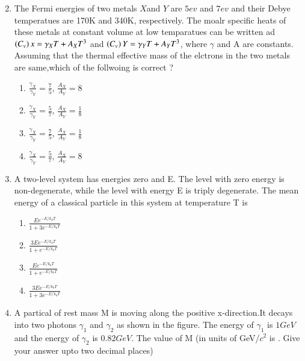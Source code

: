 \documentclass[journal]{IEEEtran}
\begin{document}
\begin{enumerate}
\begin{multicols}{2}
\end{multicols}
\vspace{0.5cm}
\item The Fermi energies of two metals $X$and $Y$ are $5ev$ and $7ev$ and their Debye temperatues are 170K and 340K, respectively. The moalr specific heats of these metals at constant volume at low temparatues can be written ad $\left(C_v\right)x=\gamma_X T+A_X T^3$ and $\left(C_v\right)Y=\gamma_Y T+A_Y T^3$, where $\gamma$ and A are constants. Assuming that the thermal effective mass of the elctrons in the two metals are same,which of the follwoing is correct ?
\begin{multicols}{2}
\begin{enumerate}
    \item $\frac{\gamma_X}{\gamma_Y}=\frac{7}{5}$, $\frac{A_X}{A_Y}=8$
    \item $\frac{\gamma_X}{\gamma_Y}=\frac{5}{7}$, $\frac{A_X}{A_Y}=\frac{1}{8}$
    \item $\frac{\gamma_X}{\gamma_Y}=\frac{7}{5}$, $\frac{A_X}{A_Y}=\frac{1}{8}$
    \item $\frac{\gamma_X}{\gamma_Y}=\frac{5}{7}$, $\frac{A_X}{A_Y}=8$
\end{enumerate}
\end{multicols}
\vspace{0.5cm}
\item A two-level system has energies zero and E. The level with zero energy is non-degenerate, while the level with energy E is triply degenerate. The mean energy of a classical particle in this system at temperature T is
\begin{multicols}{2}
    \begin{enumerate}
        \item $\frac{Ee^{-E/k_b T}}{1+3e^{-E/k_b T}}$
        \item $\frac{3Ee^{-E/k_b T}}{1+e^{-E/k_b T}}$
        \item $\frac{Ee^{-E/k_b T}}{1+e^{-E/k_b T}}$
        \item $\frac{3Ee^{-E/k_b T}}{1+3e^{-E/k_b T}}$
    \end{enumerate}
\end{multicols}

\vspace{0.5cm}
\item A partical of rest mass M is moving along the positive x-direction.It decays into two photons $\gamma_1$ and $\gamma_2$ as shown in the figure. The energy of $\gamma_1$ is $1GeV$ and the energy of $\gamma_2$ is $0.82 GeV$. The value of M (in units of GeV/$c^2$ is \underline{\hspace{2cm}}. Give your answer upto two decimal places)


\end{enumerate}
\end{document}
